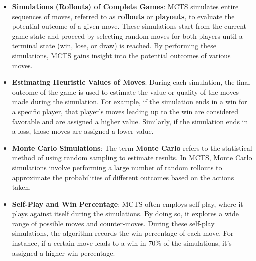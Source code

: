 \documentclass{article}
\begin{document}
\begin{itemize}
    \item \textbf{Simulations (Rollouts) of Complete Games}:
    MCTS simulates entire sequences of moves, referred to as \textbf{rollouts} or \textbf{playouts}, to evaluate the potential outcome of a given move. These simulations start from the current game state and proceed by selecting random moves for both players until a terminal state (win, lose, or draw) is reached. By performing these simulations, MCTS gains insight into the potential outcomes of various moves.
    
    \item \textbf{Estimating Heuristic Values of Moves}:
    During each simulation, the final outcome of the game is used to estimate the value or quality of the moves made during the simulation. For example, if the simulation ends in a win for a specific player, that player's moves leading up to the win are considered favorable and are assigned a higher value. Similarly, if the simulation ends in a loss, those moves are assigned a lower value.
    
    \item \textbf{Monte Carlo Simulations}:
    The term \textbf{Monte Carlo} refers to the statistical method of using random sampling to estimate results. In MCTS, Monte Carlo simulations involve performing a large number of random rollouts to approximate the probabilities of different outcomes based on the actions taken.
    
    \item \textbf{Self-Play and Win Percentage}:
    MCTS often employs self-play, where it plays against itself during the simulations. By doing so, it explores a wide range of possible moves and counter-moves. During these self-play simulations, the algorithm records the win percentage of each move. For instance, if a certain move leads to a win in 70\% of the simulations, it's assigned a higher win percentage.
\end{itemize}
\end{document}
